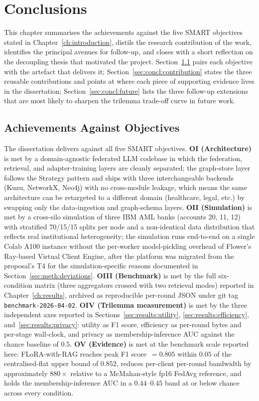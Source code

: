 \documentclass{report}
\begin{document}
\chapter{Conclusions}
\label{ch:conclusions}

This chapter summarises the achievements against the five SMART objectives stated in Chapter~\ref{ch:introduction}, distils the research contribution of the work, identifies the principal avenues for follow-up, and closes with a short reflection on the decoupling thesis that motivated the project. Section~\ref{sec:concl:achievements} pairs each objective with the artefact that delivers it; Section~\ref{sec:concl:contribution} states the three reusable contributions and points at where each piece of supporting evidence lives in the dissertation; Section~\ref{sec:concl:future} lists the three follow-up extensions that are most likely to sharpen the trilemma trade-off curve in future work.

\section{Achievements Against Objectives}
\label{sec:concl:achievements}

The dissertation delivers against all five SMART objectives. \textbf{OI (Architecture)} is met by a domain-agnostic federated LLM codebase in which the federation, retrieval, and adapter-training layers are cleanly separated; the graph-store layer follows the Strategy pattern and ships with three interchangeable backends (Kuzu, NetworkX, Neo4j) with no cross-module leakage, which means the same architecture can be retargeted to a different domain (healthcare, legal, etc.) by swapping only the data-ingestion and graph-schema layers. \textbf{OII (Simulation)} is met by a cross-silo simulation of three IBM AML banks (accounts 20, 11, 12) with stratified 70/15/15 splits per node and a non-identical data distribution that reflects real institutional heterogeneity; the simulation runs end-to-end on a single Colab A100 instance without the per-worker model-pickling overhead of Flower's Ray-based Virtual Client Engine, after the platform was migrated from the proposal's T4 for the simulation-specific reasons documented in Section~\ref{sec:meth:deviations}. \textbf{OIII (Benchmark)} is met by the full six-condition matrix (three aggregators crossed with two retrieval modes) reported in Chapter~\ref{ch:results}, archived as reproducible per-round JSON under git tag \texttt{benchmark-2026-04-02}. \textbf{OIV (Trilemma measurement)} is met by the three independent axes reported in Sections~\ref{sec:results:utility}, \ref{sec:results:efficiency}, and~\ref{sec:results:privacy}: utility as F1 score, efficiency as per-round bytes and per-stage wall-clock, and privacy as membership-inference AUC against the chance baseline of $0.5$. \textbf{OV (Evidence)} is met at the benchmark scale reported here: FLoRA-with-RAG reaches peak F1 score~$=0.805$ within $0.05$ of the centralised-flat upper bound of $0.852$, reduces per-client per-round bandwidth by approximately $880\times$ relative to a McMahan-style fp16 FedAvg reference, and holds the membership-inference AUC in a $0.44$--$0.45$ band at or below chance across every condition.
\end{document}
